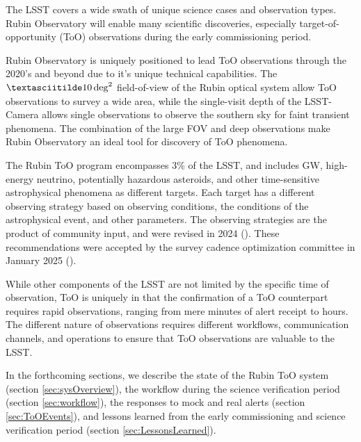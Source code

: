 The LSST covers a wide swath of unique science cases and observation types. Rubin Observatory will enable many scientific discoveries, especially target-of-opportunity (ToO) observations during the early commissioning period. 

Rubin Observatory is uniquely positioned to lead ToO observations through the 2020's and beyond due to it's unique technical capabilities. The $\textasciitilde10\deg^2$ field-of-view of the Rubin optical system allow ToO observations to survey a wide area, while the single-visit depth of the LSST-Camera allows single observations to observe the southern sky for faint transient phenomena. The combination of the large FOV and deep observations make Rubin Observatory an ideal tool for discovery of ToO phenomena.

The Rubin ToO program encompasses 3\% of the LSST, and includes GW, high-energy neutrino, potentially hazardous asteroids, and other time-sensitive astrophysical phenomena as different targets. Each target has a different observing strategy based on observing conditions, the conditions of the astrophysical event, and other parameters. The observing strategies are the product of community input, and were revised in 2024 (\cite{RubinToO2024}). These recommendations were accepted by the survey cadence optimization committee in January 2025 (\cite{lsstSurveyCadence}).

While other components of the LSST are not limited by the specific time of observation, ToO is uniquely in that the confirmation of a ToO counterpart requires rapid observations, ranging from mere minutes of alert receipt to hours. The different nature of observations requires different workflows, communication channels, and operations to ensure that ToO observations are valuable to the LSST. 

In the forthcoming sections, we describe the state of the Rubin ToO system (section \ref{sec:sysOverview}), the workflow during the science verification period (section \ref{sec:workflow}), the responses to mock and real alerts (section \ref{sec:ToOEvents}), and lessons learned from the early commissioning and science verification period (section \ref{sec:LessonsLearned}).